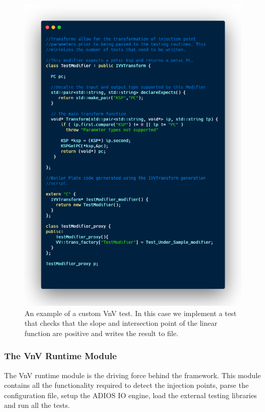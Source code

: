 \begin{figure}
 \includegraphics[height=0.9\textheight, width=\textwidth]{./Figures/test-modifier.png}
 \caption{An example of a custom VnV test. In this case we implement a test that checks that the slope and intersection point of the linear function are positive and writes
 the result to file. \label{test-mod}}
\end{figure}


\subsubsection{The VnV Runtime Module}

The VnV runtime module is the driving force behind the framework. This module contains all the functionality required to detect the injection points, parse the
configuration file, setup the ADIOS IO engine, load the external testing libraries and run all the tests.

